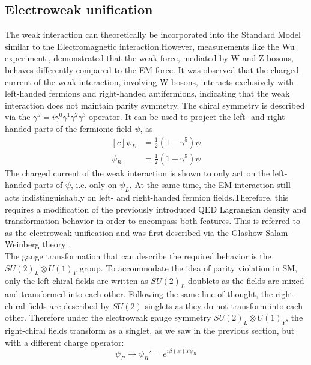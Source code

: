 \subsection{\label{subsec:Electroweak}Electroweak unification}
\noindent The weak interaction can theoretically be incorporated into the Standard Model similar to the Electromagnetic interaction.However, measurements like the Wu experiment \cite{Wu}, demonstrated that the weak force, mediated by W and Z bosons, behaves differently compared to the EM force. It was observed that the charged current of the weak interaction, involving W bosons, interacts exclusively with left-handed fermions and right-handed antifermions, indicating that the weak interaction does not maintain parity symmetry. The chiral symmetry is described via the $\gamma^5 = i \gamma^0 \gamma^1 \gamma^2 \gamma^3$ operator. It can be used to project the left- and right-handed parts of the fermionic field $\psi$, as
\begin{equation}
    \begin{aligned}[c]
        \psi_L &= \frac{1}{2}(1-\gamma^5)\psi \\
        \psi_R &= \frac{1}{2}(1+\gamma^5)\psi
    \end{aligned}
\end{equation}
The charged current of the weak interaction is shown to only act on the left-handed parts of $\psi$, i.e. only on $\psi_L$. At the same time, the EM interaction still acts indistinguishably on left- and right-handed fermion fields.Therefore, this requires a modification of the previously introduced QED Lagrangian density and transformation behavior in order to encompass both features. This is referred to as the electroweak unification and was first described via the Glashow-Salam-Weinberg theory \cite{Weinberg_Electroweak, SALAM_Electroweak, GLASHOW_Electroweak}.\\
\indent The gauge transformation that can describe the required behavior is the $SU(2)_L\otimes U(1)_Y$ group. To accommodate the idea of parity violation in SM, only the left-chiral fields are written as $SU(2)_L$ doublets as the fields are mixed and transformed into each other. Following the same line of thought, the right-chiral fields are described by $SU(2)$ singlets as they do not transform into each other. Therefore under the electroweak gauge symmetry $SU(2)_L \otimes U(1)_Y$, the right-chiral fields transform as a singlet, as we saw in the previous section, but with a different charge operator:
\begin{equation} \label{eq:EW_singlet}
    \psi_R \rightarrow \psi_R' = e^{i\beta(x)Y\psi_R}
\end{equation}
